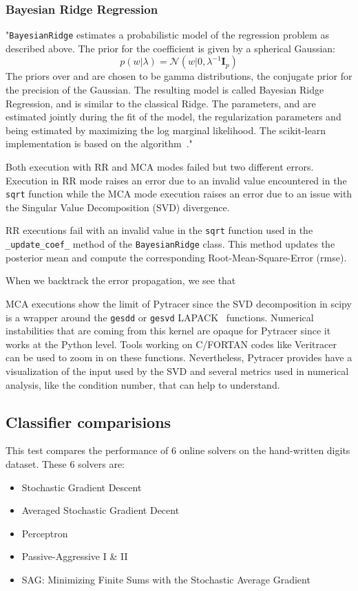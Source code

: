 \documentclass[11pt]{article}
\begin{document}
\subsubsection{Bayesian Ridge Regression}

"\texttt{BayesianRidge} estimates a probabilistic model of the regression problem as described above. 
The prior for the coefficient  is given by a spherical Gaussian:
\[
    p(w|\lambda)=\mathcal{N}(w|0,\lambda^{-1}\mathbf{I}_p)
\]
The priors over  and  are chosen to be gamma distributions, the conjugate prior for the precision of the Gaussian. 
The resulting model is called Bayesian Ridge Regression, and is similar to the classical Ridge.
The parameters, and are estimated jointly during the fit of the model, 
the regularization parameters and being estimated by maximizing the log marginal likelihood. 
The scikit-learn implementation is based on the algorithm~\cite{tipping2001sparse}."

Both execution with RR and MCA modes failed but two different errors. 
Execution in RR mode raises an error due to an invalid value encountered in the \texttt{sqrt} function
while the MCA mode execution raises an error due to an issue with the Singular Value Decomposition (SVD) divergence.

RR executions fail with an invalid value in the \texttt{sqrt} function 
used in the \texttt{\_update\_coef\_} method of the \texttt{BayesianRidge} class.
This method updates the posterior mean and compute the corresponding Root-Mean-Square-Error (rmse).

When we backtrack the error propagation, we see that 

MCA executions show the limit of Pytracer since the SVD decomposition in scipy is a wrapper around the 
\texttt{gesdd} or \texttt{gesvd} LAPACK~\cite{anderson1999lapack} functions. 
Numerical instabilities that are coming from this kernel are opaque for Pytracer since it works 
at the Python level. Tools working on C/FORTAN codes 
like Veritracer~\cite{chatelain2018veritracer} can be used to zoom in on these functions.
Nevertheless, Pytracer provides have a visualization of the input used by the SVD and several
metrics used in numerical analysis, like the condition number, that can help to understand.

\subsection{Classifier comparisions}

This test compares the performance of 6 online solvers on the hand-written digits dataset.
These 6 solvers are:
\begin{itemize}
    \item Stochastic Gradient Descent 
    \item Averaged Stochastic Gradient Decent
    \item Perceptron
    \item Passive-Aggressive I \& II
    \item SAG: Minimizing Finite Sums with the Stochastic Average Gradient
\end{itemize}
\end{document}
